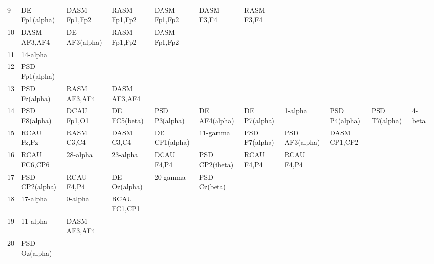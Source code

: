 \begin{landscape}
\begin{table}[]
\begin{tabular}{l|llllllll}
9        & DE Fp1(alpha)  & DASM Fp1,Fp2   & RASM Fp1,Fp2   & DASM Fp1,Fp2   & DASM F3,F4     & RASM F3,F4     &                &                &               &              \\
10       & DASM AF3,AF4   & DE AF3(alpha)  & RASM Fp1,Fp2   & DASM Fp1,Fp2   &                &                &                &                &               &              \\
11       & 14-alpha       &                &                &                &                &                &                &                &               &              \\
12       & PSD Fp1(alpha) &                &                &                &                &                &                &                &               &              \\
13       & PSD Fz(alpha)  & RASM AF3,AF4   & DASM AF3,AF4   &                &                &                &                &                &               &              \\
14       & PSD F8(alpha)  & DCAU Fp1,O1    & DE FC5(beta)   & PSD P3(alpha)  & DE AF4(alpha)  & DE P7(alpha)   & 1-alpha        & PSD P4(alpha)  & PSD T7(alpha) & 4-beta       \\
15       & RCAU Fz,Pz     & RASM C3,C4     & DASM C3,C4     & DE CP1(alpha)  & 11-gamma       & PSD F7(alpha)  & PSD AF3(alpha) & DASM CP1,CP2   &               &              \\
16       & RCAU FC6,CP6   & 28-alpha       & 23-alpha       & DCAU F4,P4     & PSD CP2(theta) & RCAU F4,P4     & RCAU F4,P4     &                &               &              \\
17       & PSD CP2(alpha) & RCAU F4,P4     & DE Oz(alpha)   & 20-gamma       & PSD Cz(beta)   &                &                &                &               &              \\
18       & 17-alpha       & 0-alpha        & RCAU FC1,CP1   &                &                &                &                &                &               &              \\
19       & 11-alpha       & DASM AF3,AF4   &                &                &                &                &                &                &               &              \\
20       & PSD Oz(alpha)  &                &                &                &                &                &                &                &               &              \\

\end{tabular}
\end{table}
\end{landscape}
